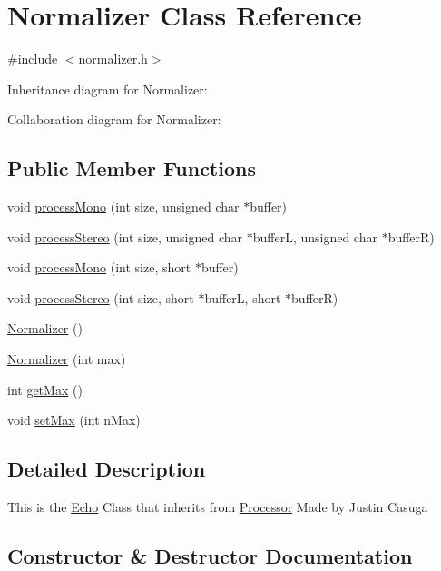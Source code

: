 \hypertarget{classNormalizer}{}\section{Normalizer Class Reference}
\label{classNormalizer}


{\ttfamily \#include $<$normalizer.\+h$>$}



Inheritance diagram for Normalizer\+:


Collaboration diagram for Normalizer\+:
\subsection*{Public Member Functions}
\begin{DoxyCompactItemize}
\item 
void \hyperlink{classNormalizer_a6063bdca1769d4f5dca7d76272344a03}{process\+Mono} (int size, unsigned char $\ast$buffer)
\item 
void \hyperlink{classNormalizer_aa9d9a19237a6b208ead3a9cc96b07451}{process\+Stereo} (int size, unsigned char $\ast$bufferL, unsigned char $\ast$bufferR)
\item 
void \hyperlink{classNormalizer_aa997755adc989a2b6610cfd944824bdc}{process\+Mono} (int size, short $\ast$buffer)
\item 
void \hyperlink{classNormalizer_a8a907de202a6f1173cd2ee8b7266971e}{process\+Stereo} (int size, short $\ast$bufferL, short $\ast$bufferR)
\item 
\hyperlink{classNormalizer_af576151323854ff0d4d7e37255c397d1}{Normalizer} ()
\item 
\hyperlink{classNormalizer_a5ae90bf733bda279916ef5c05a15d0c1}{Normalizer} (int max)
\item 
int \hyperlink{classNormalizer_aaa963519038425f08b3b2ca933cd4215}{get\+Max} ()
\item 
void \hyperlink{classNormalizer_aadfdabbf13c93c2775f99ddef9ebe6b9}{set\+Max} (int n\+Max)
\end{DoxyCompactItemize}


\subsection{Detailed Description}
This is the \hyperlink{classEcho}{Echo} Class that inherits from \hyperlink{classProcessor}{Processor} Made by Justin Casuga 

\subsection{Constructor \& Destructor Documentation}
\mbox{\label{classNormalizer_af576151323854ff0d4d7e37255c397d1}} 
